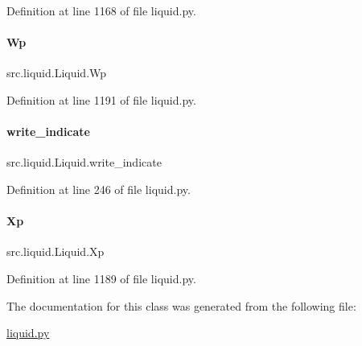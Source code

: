 Definition at line 1168 of file liquid.\+py.

\mbox{\label{classsrc_1_1liquid_1_1Liquid_a71c4080be710cf3f450ce618340f54f2}} 
\paragraph{\texorpdfstring{Wp}{Wp}}
{\footnotesize\ttfamily src.\+liquid.\+Liquid.\+Wp}



Definition at line 1191 of file liquid.\+py.

\mbox{\label{classsrc_1_1liquid_1_1Liquid_a74646db7c89f4f7f07578e0840f182b0}} 
\paragraph{\texorpdfstring{write\+\_\+indicate}{write\_indicate}}
{\footnotesize\ttfamily src.\+liquid.\+Liquid.\+write\+\_\+indicate}



Definition at line 246 of file liquid.\+py.

\mbox{\label{classsrc_1_1liquid_1_1Liquid_ae2b753e0fc7b02a275cc45bccce2419a}} 
\paragraph{\texorpdfstring{Xp}{Xp}}
{\footnotesize\ttfamily src.\+liquid.\+Liquid.\+Xp}



Definition at line 1189 of file liquid.\+py.



The documentation for this class was generated from the following file\+:\begin{DoxyCompactItemize}
\item 
\hyperlink{liquid_8py}{liquid.\+py}\end{DoxyCompactItemize}
